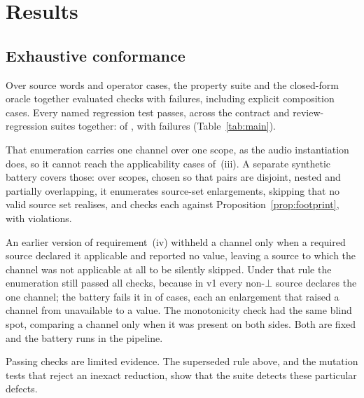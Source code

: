 \documentclass[preprint,3p,11pt,authoryear]{elsarticle}
\begin{document}
\section{Results}
\label{sec:results}

\subsection{Exhaustive conformance}
\label{sec:res-conformance}

Over \Awords{} source words and \Acases{} operator cases, the property suite
and the closed-form oracle together evaluated \Achecks{} checks with
\Afailed{} failures, including \Acomp{} explicit composition cases. Every named regression test passes, across the contract and review-regression
suites together: \Tpass{} of \Ttotal{}, with \Tfail{} failures
(Table~\ref{tab:main}).

\begin{table}[!tp]
\centering
\caption{Main results. Deterministic fixture rates characterise the frozen
fixture family and are a mechanism stress rate, not a population prevalence
estimate.}
\label{tab:main}
\small

\end{table}

That enumeration carries one channel over one scope, as the audio
instantiation does, so it cannot reach the applicability cases of~(iii). A
separate synthetic battery covers those: over \LscopeScopes{} scopes, chosen so
that pairs are disjoint, nested and partially overlapping, it enumerates
\LscopeCases{} source-set enlargements, skipping \LscopeSkipped{} that no
valid source set realises, and checks each against
Proposition~\ref{prop:footprint}, with \LscopeViolations{} violations.

An earlier version of requirement~(iv) withheld a
channel only when a required source declared it applicable and reported no
value, leaving a source to which the channel was not applicable at all to be
silently skipped. Under that rule the enumeration still passed all \Achecks{}
checks, because in v1 every non-$\bot$ source declares the one channel; the
battery fails it in \LscopeFailBad{} of \LscopeCases{} cases, each an
enlargement that raised a channel from unavailable to a value. The
monotonicity check had the same blind spot, comparing a channel only when it
was present on both sides. Both are fixed and the battery runs in the pipeline.

Passing checks are limited evidence. The superseded rule above, and the
mutation tests that reject an inexact reduction, show that the suite detects
these particular defects.
\end{document}

